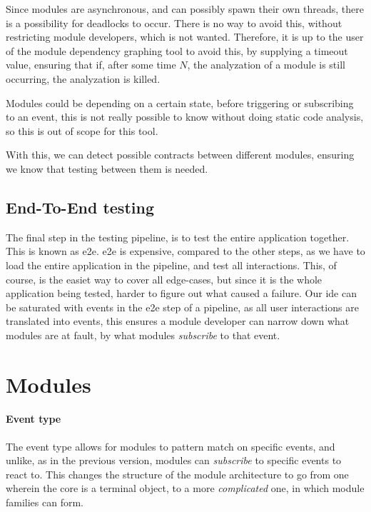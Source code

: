 Since modules are asynchronous, and can possibly spawn their own threads, there
is a possibility for deadlocks to occur. There is no way to avoid this, without
restricting module developers, which is not wanted. Therefore, it is up to
the user of the module dependency graphing tool to avoid this, by supplying a
timeout value, ensuring that if, after some time $N$, the analyzation of a
module is still occurring, the analyzation is killed.

Modules could be depending on a certain state, before triggering or
subscribing to an event, this is not really possible to know without doing
static code analysis, so this is out of scope for this tool.

With this, we can detect possible contracts between different modules, ensuring
we know that testing between them is needed.


\subsection{End-To-End testing}

The final step in the testing pipeline, is to test the entire application
together. This is known as \gls*{e2e}. \gls*{e2e} is expensive, compared to the
other steps, as we have to load the entire application in the pipeline, and test
all interactions. This, of course, is the easiet way to cover all edge-cases, but
since it is the whole application being tested, harder to figure out what caused
a failure. Our \gls*{ide} can be saturated with events in the \gls*{e2e} step of a
pipeline, as all user interactions are translated into events, this ensures a
module developer can narrow down what modules are at fault, by what modules
\textit{subscribe} to that event.

\section{Modules} \label{sec:modules}

\paragraph{Event type} The event type allows for modules to pattern match on
specific events, and unlike, as in the previous version, modules can
\textit{subscribe} to specific events to react to. This changes the structure of
the module architecture to go from one wherein the core is a terminal object, to
a more \textit{complicated} one, in which module families can form.


